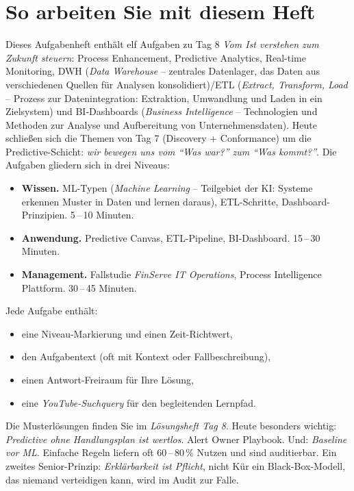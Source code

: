 \documentclass[11pt,a4paper,oneside]{article}
\newcommand{\fachbegriff}[1]{\textbf{#1}}
\newcommand{\niveaubadge}[2]{%
  \tcbox[on line, colback=#1, colframe=#1, coltext=white,
         boxrule=0pt, arc=2pt, left=5pt,right=5pt,top=1pt,bottom=1pt,
         nobeforeafter]{\sffamily\bfseries\footnotesize #2}%
}
\newcommand{\nivLi}{\niveaubadge{lpL1}{L1\,\textbullet\,Wissen}}
\newcommand{\nivLii}{\niveaubadge{lpL2}{L2\,\textbullet\,Anwendung}}
\newcommand{\nivLiii}{\niveaubadge{lpL3}{L3\,\textbullet\,Management}}
\begin{document}
\section*{So arbeiten Sie mit diesem Heft}
\thispagestyle{plain}

\noindent Dieses Aufgabenheft enth\"alt elf Aufgaben zu Tag 8 \textendash{} \emph{Vom Ist verstehen zum Zukunft steuern}: Process Enhancement, Predictive Analytics, Real-time Monitoring, DWH (\emph{Data Warehouse} -- zentrales Datenlager, das Daten aus verschiedenen Quellen f\"ur Analysen konsolidiert)/ETL (\emph{Extract, Transform, Load} -- Prozess zur Datenintegration: Extraktion, Umwandlung und Laden in ein Zielsystem) und BI-Dashboards (\emph{Business Intelligence} -- Technologien und Methoden zur Analyse und Aufbereitung von Unternehmensdaten). Heute schlie{\ss}en sich die Themen von Tag 7 (Discovery + Conformance) um die Predictive-Schicht: \emph{wir bewegen uns vom ``Was war?'' zum ``Was kommt?''}. Die Aufgaben gliedern sich in drei Niveaus:

\begin{itemize}
  \item \nivLi{} \textendash{} \fachbegriff{Wissen.} ML-Typen (\emph{Machine Learning} -- Teilgebiet der KI: Systeme erkennen Muster in Daten und lernen daraus), ETL-Schritte, Dashboard-Prinzipien. 5\,--\,10 Minuten.
  \item \nivLii{} \textendash{} \fachbegriff{Anwendung.} Predictive Canvas, ETL-Pipeline, BI-Dashboard. 15\,--\,30 Minuten.
  \item \nivLiii{} \textendash{} \fachbegriff{Management.} Fallstudie \emph{FinServe IT Operations}, Process Intelligence Plattform. 30\,--\,45 Minuten.
\end{itemize}

\noindent Jede Aufgabe enth\"alt:
\begin{itemize}
  \item eine Niveau-Markierung und einen Zeit-Richtwert,
  \item den Aufgabentext (oft mit Kontext oder Fallbeschreibung),
  \item einen Antwort-Freiraum f\"ur Ihre L\"osung,
  \item eine \emph{YouTube-Suchquery} f\"ur den begleitenden Lernpfad.
\end{itemize}

\begin{infobox}[Hinweis]
Die Musterl\"osungen finden Sie im \emph{L\"osungsheft Tag 8}. Heute besonders wichtig: \emph{Predictive ohne Handlungsplan ist wertlos}. Alert \textrightarrow{} Owner \textrightarrow{} Playbook. Und: \emph{Baseline vor ML}. Einfache Regeln liefern oft 60\,--\,80\,\% Nutzen und sind auditierbar. Ein zweites Senior-Prinzip: \emph{Erkl\"arbarkeit ist Pflicht}, nicht K\"ur \textendash{} ein Black-Box-Modell, das niemand verteidigen kann, wird im Audit zur Falle.
\end{infobox}
\end{document}
